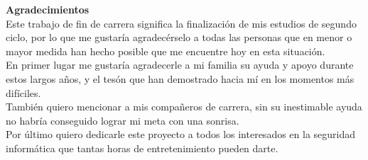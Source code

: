 \documentclass{article}
\begin{document}
\Huge{\quad \textbf{Agradecimientos}}\\

\normalsize{\quad \quad Este trabajo de fin de carrera significa la finalización de mis estudios de segundo ciclo, por lo que me gustaría agradecérselo a todas las personas que en menor o mayor medida han hecho posible que me encuentre hoy en esta situación.\\

\quad \quad En primer lugar me gustaría agradecerle a mi familia su ayuda y apoyo durante estos largos años, y el tesón que han demostrado hacia mí en los momentos más difíciles.\\

\quad \quad También quiero mencionar a mis compañeros de carrera, sin su inestimable ayuda no habría conseguido lograr mi meta con una sonrisa.\\

\quad \quad Por último quiero dedicarle este proyecto a todos los interesados en la seguridad informática que tantas horas de entretenimiento pueden darte.\\}
\end{document}
